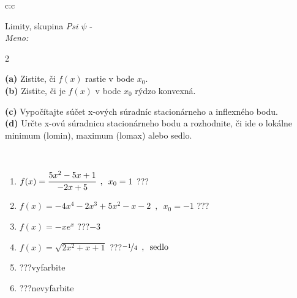\documentclass[10pt]{report}
\begin{document}
\begin{tabular}{c:c}
\begin{minipage}[c][104.5mm][t]{0.5\linewidth}
\begin{center}
\vspace{7mm}
{\huge Limity, skupina \textit{Psi $\psi$} -}\\[5mm]
\textit{Meno:}\phantom{xxxxxxxxxxxxxxxxxxxxxxxxxxxxxxxxxxxxxxxxxxxxxxxxxxxxxxxxxxxxxxxxx}\\[5mm]
\begin{minipage}{0.95\linewidth}
\begin{center}
{\small \begin{multicols}{2} \raggedright
\textbf{(a)} Zistite, či \(f(x)\) rastie v bode \(x_0\). \\[1mm]
\textbf{(b)} Zistite, či je \(f(x)\) v bode \(x_0\) rýdzo konvexná. \par \columnbreak
\textbf{(c)} Vypočítajte súčet x-ových súradníc stacionárneho a inflexného bodu. \\[1mm]
\textbf{(d)} Určte x-ovú súradnicu stacionárneho bodu a rozhodnite, či ide o lokálne minimum (lomin), maximum (lomax) alebo sedlo. \\[1mm]
\end{multicols}
}
\end{center}
\end{minipage}
\\[4mm]
\begin{minipage}{0.79\linewidth}
\begin{center}
\begin{varwidth}{\linewidth}
\begin{enumerate}
\normalsize
\item $f(x)=\cfrac{5x^2-5x+1}{-2x+5}\enspace , \enspace x_0=1$\quad \dotfill\; ???\;\dotfill \quad {}
\item $f(x)=-4x^4-2x^3+5x^2-x-2\enspace , \enspace x_0=-1$\quad \dotfill\; ???\;\dotfill \quad {}
\item $f(x)=-xe^{x}$\quad \dotfill\; ???\;\dotfill \quad $-3$
\item $f(x)=\sqrt{2x^2+x+1}$\quad \dotfill\; ???\;\dotfill \quad $\nicefrac{-1}{4}\enspace , \enspace\text{sedlo}$
\item \quad \dotfill\; ???\;\dotfill \quad vyfarbite
\item \quad \dotfill\; ???\;\dotfill \quad nevyfarbite
\end{enumerate}
\end{varwidth}
\end{center}

\end{minipage}
\end{center}
\end{minipage}
\end{tabular}
\end{document}
